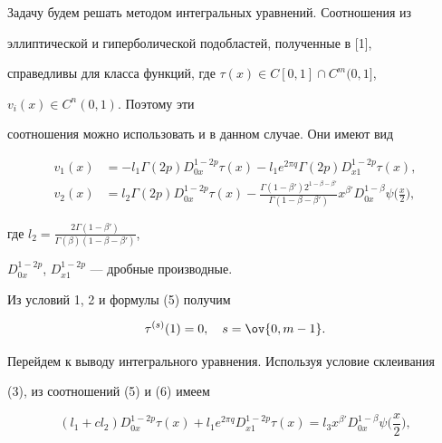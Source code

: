  


Задачу будем решать методом интегральных уравнений. Соотношения из 


эллиптической и гиперболической подобластей, полученные в [1], 


справедливы для класса функций, где $\tau(x)\in C[0,1]\cap C^m(0,1]$, 


$v_i(x)\in C^n(0,1)$. Поэтому эти 


соотношения можно использовать и в данном случае. Они имеют вид 


\begin{align} 


v_1(x)&=-l_1\Gamma(2p)D^{1-2p}_{0x}\tau(x)-l_1e^{2\pi q} 


\Gamma(2p)D^{1-2p}_{x1}\tau(x),\\ 


% 


v_2(x)&=l_2\Gamma(2p)D^{1-2p}_{0x}\tau(x)- 


\frac{\Gamma(1-\beta')2^{1-\beta-\beta'}}{\Gamma(1-\beta-\beta')} 


x^{\beta'}D^{1-\beta}_{0x}\psi\bigg(\frac{x}{2} \bigg), 


\end{align} 


где $l_2=\frac{2\Gamma(1-\beta')}{\Gamma(\beta)(1-\beta-\beta')}$, 


$D^{1-2p}_{0x}$, $D^{1-2p}_{x1}$ --- дробные производные. 


 


Из условий 1, 2 и формулы (5) получим


\begin{equation} 


\tau^{(s)}(1)=0,\quad s=\ov{0,m-1}. 


\end{equation} 


 


Перейдем к выводу интегрального уравнения. Используя условие склеивания 


(3), из соотношений (5) и (6) имеем 


\begin{equation} 


(l_1+cl_2)D^{1-2p}_{0x}\tau(x)+l_1e^{2\pi q}D^{1-2p}_{x1}\tau(x) 


=l_3x^{\beta'}D^{1-\beta}_{0x}\psi\bigg(\frac{x}{2} \bigg), 


\end{equation} 


